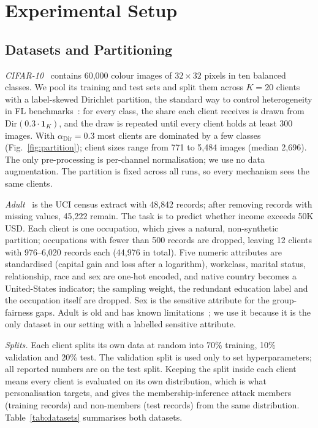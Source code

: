 \section{Experimental Setup}\label{sec:setup}

\subsection{Datasets and Partitioning}
\emph{CIFAR-10}~\cite{krizhevsky2009learning} contains 60{,}000 colour images of $32\times32$ pixels in ten balanced
classes. We pool its training and test sets and split them across $K=20$ clients with a label-skewed Dirichlet
partition, the standard way to control heterogeneity in FL benchmarks~\cite{li2022federated}: for every class, the
share each client receives is drawn from $\mathrm{Dir}(0.3\cdot\mathbf 1_K)$, and the draw is repeated until every
client holds at least 300 images. With $\alpha_{\mathrm{Dir}}=0.3$ most clients are dominated by a few classes
(Fig.~\ref{fig:partition}); client sizes range from 771 to 5{,}484 images (median 2{,}696). The only
pre-processing is per-channel normalisation; we use no data augmentation. The partition is fixed across all runs, so
every mechanism sees the same clients.

\emph{Adult}~\cite{becker1996adult} is the UCI census extract with 48{,}842 records; after removing records with
missing values, 45{,}222 remain. The task is to predict whether income exceeds 50K USD. Each client is one
occupation, which gives a natural, non-synthetic partition; occupations with fewer than 500 records are dropped,
leaving 12 clients with 976--6{,}020 records each (44{,}976 in total). Five numeric attributes are standardised (capital
gain and loss after a logarithm), workclass, marital status, relationship, race and sex are one-hot encoded, and
native country becomes a United-States indicator; the sampling weight, the redundant education label and the
occupation itself are dropped. Sex is the sensitive attribute for the group-fairness gaps. Adult is old and has
known limitations~\cite{ding2021retiring}; we use it because it is the only dataset in our setting with a labelled
sensitive attribute.

\emph{Splits.} Each client splits its own data at random into 70\% training, 10\% validation and 20\% test. The
validation split is used only to set hyperparameters; all reported numbers are on the test split. Keeping the split
inside each client means every client is evaluated on its own distribution, which is what personalisation targets,
and gives the membership-inference attack members (training records) and non-members (test records) from the same
distribution. Table~\ref{tab:datasets} summarises both datasets.

